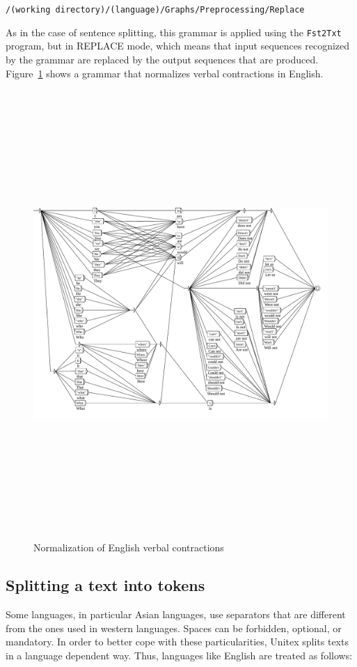 \bigskip \verb+/(working directory)/(language)/Graphs/Preprocessing/Replace+

\bigskip
\noindent As in the case of sentence splitting, this grammar is applied using the
\verb+Fst2Txt+ 
program, but in REPLACE mode, which means that input sequences recognized by the
grammar are replaced by the output sequences that are produced.
Figure~\ref{fig-normalization-grammar} shows a grammar that
normalizes verbal contractions in English.

\begin{figure}[!p]
\begin{center}
\includegraphics[height=17cm,angle=90]{resources/img/fig2-11.pdf}
\caption{Normalization of English verbal
contractions\label{fig-normalization-grammar}}
\end{center}
\end{figure}



\subsection{Splitting a text into tokens}
\label{tokenization}
Some languages, in particular Asian languages, use separators that are different
from the ones used in  western languages. Spaces can be forbidden, optional, or
mandatory. In order to better cope with these particularities,  Unitex splits
texts in a language dependent way. Thus, languages like English are treated as
follows:

